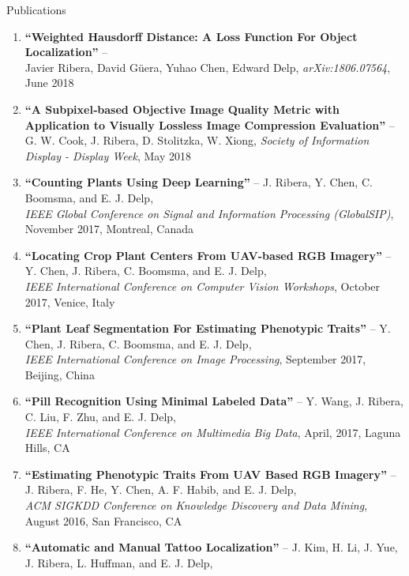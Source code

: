 \documentclass{resume} %
\begin{document}
\begin{rSection}{Publications}

\footnotesize
\begin{enumerate}
\setlength{\itemindent}{-.1in}
\item 
\textbf{``Weighted Hausdorff Distance: A Loss Function For Object Localization''} -- 
    \\ Javier Ribera, David Güera, Yuhao Chen, Edward Delp, \emph{arXiv:1806.07564}, June 2018
\item 
\textbf{``A Subpixel‐based Objective Image Quality Metric with Application to Visually Lossless Image Compression Evaluation''} -- 
    \\ G. W. Cook, J. Ribera, D. Stolitzka, W. Xiong, \emph{Society of Information Display - Display Week}, May 2018
\item 
\textbf{``Counting Plants Using Deep Learning''} -- J. Ribera, Y. Chen, C. Boomsma, and E. J. Delp, \\
		\emph{IEEE Global Conference on Signal and Information Processing (GlobalSIP)}, November 2017, Montreal, Canada
\item 
\textbf{``Locating Crop Plant Centers From UAV-based RGB Imagery''} -- Y. Chen, J. Ribera, C. Boomsma, and E. J. Delp, \\
		\emph{IEEE International Conference on Computer Vision Workshops}, October 2017, Venice, Italy
\item 
\textbf{``Plant Leaf Segmentation For Estimating Phenotypic Traits''} -- Y. Chen, J. Ribera, C. Boomsma, and E. J. Delp, \\
		\emph{IEEE International Conference on Image Processing}, September 2017, Beijing, China
\item 
\textbf{``Pill Recognition Using Minimal Labeled Data''} -- Y. Wang, J. Ribera, C. Liu, F. Zhu, and E. J. Delp, \\
		\emph{IEEE International Conference on Multimedia Big Data}, April, 2017, Laguna Hills, CA %
\item 
\textbf{``Estimating Phenotypic Traits From UAV Based RGB Imagery''} -- J. Ribera, F. He, Y. Chen, A. F. Habib, and E. J. Delp, \\
		\emph{ACM SIGKDD Conference on Knowledge Discovery and Data Mining}, August 2016, San Francisco, CA
\item 
\textbf{``Automatic and Manual Tattoo Localization''} -- J. Kim, H. Li, J. Yue, J. Ribera, L. Huffman, and E. J. Delp, \\

\end{enumerate}
\end{rSection}
\end{document}
